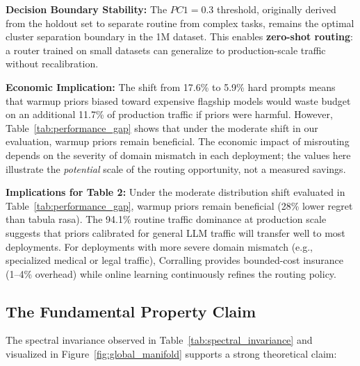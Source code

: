 \begin{table}[h!]
\begin{tablenotes}
\item \textbf{Decision Boundary Stability:} The $PC1 = 0.3$ threshold, originally derived from the holdout set to separate routine from complex tasks, remains the optimal cluster separation boundary in the 1M dataset. This enables \textbf{zero-shot routing}: a router trained on small datasets can generalize to production-scale traffic without recalibration.

\item \textbf{Economic Implication:} The shift from 17.6\% to 5.9\% hard prompts means that warmup priors biased toward expensive flagship models would waste budget on an additional 11.7\% of production traffic if priors were harmful. However, Table~\ref{tab:performance_gap} shows that under the moderate shift in our evaluation, warmup priors remain beneficial. The economic impact of misrouting depends on the severity of domain mismatch in each deployment; the values here illustrate the \emph{potential} scale of the routing opportunity, not a measured savings.

\item \textbf{Implications for Table 2:} Under the moderate distribution shift evaluated in Table~\ref{tab:performance_gap}, warmup priors remain beneficial (28\% lower regret than tabula rasa). The 94.1\% routine traffic dominance at production scale suggests that priors calibrated for general LLM traffic will transfer well to most deployments. For deployments with more severe domain mismatch (e.g., specialized medical or legal traffic), Corralling provides bounded-cost insurance (1--4\% overhead) while online learning continuously refines the routing policy.
\end{tablenotes}
\end{table}

\subsection{The Fundamental Property Claim}

The spectral invariance observed in Table~\ref{tab:spectral_invariance} and visualized in Figure~\ref{fig:global_manifold} supports a strong theoretical claim:

